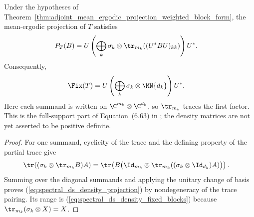 \begin{theorem}%
    \label{thm:mean_ergodic_projection_density_block_form}
    \leanok
    Under the hypotheses of
    Theorem~\ref{thm:adjoint_mean_ergodic_projection_weighted_block_form},
    the mean-ergodic projection of $T$ satisfies
    \begin{align}
        P_T(B)
         & =U\left(\bigoplus_k\sigma_k\otimes
             \tr_{m_k}((U^*BU)_{kk})\right)U^*.
        \label{eq:spectral_ds_density_projection}
    \end{align}
    Consequently,
    \begin{align}
        \Fix(T)
         & =U\left(\bigoplus_k\sigma_k\otimes\MN{d_k}\right)U^*.
        \label{eq:spectral_ds_density_fixed_blocks}
    \end{align}
    Here each summand is written on
    $\C^{m_k}\otimes\C^{d_k}$, so $\tr_{m_k}$ traces the first factor. This
    is the full-support part of Equation~(6.63) in
    \cite[Theorem~6.14]{Wolf2012Quantum}; the density matrices are not yet
    asserted to be positive definite.
\end{theorem}

\begin{proof}
    \leanok
    For one summand, cyclicity of the trace and the defining property of the
    partial trace give
    \begin{align}
        \tr\!\left((\sigma_k\otimes\tr_{m_k}B)A\right)
         & =\tr\!\left(B\bigl(\Id_{m_k}\otimes
        \tr_{m_k}((\sigma_k\otimes\Id_{d_k})A)\bigr)\right).
        \notag
    \end{align}
    Summing over the diagonal summands and applying the unitary change of
    basis proves (\ref{eq:spectral_ds_density_projection}) by
    nondegeneracy of the trace pairing. Its range is
    (\ref{eq:spectral_ds_density_fixed_blocks}) because
    $\tr_{m_k}(\sigma_k\otimes X)=X$.
\end{proof}

